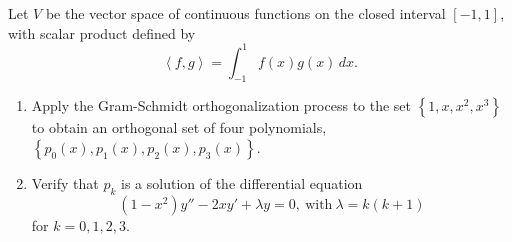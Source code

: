 \documentclass{article}
\begin{document}
\begin{problem}
 Let $V$ be the vector space of continuous functions on the closed interval $[-1,1]$, with scalar product defined by
 \[
\left<f,g \right> = \int_{-1}^{1} f(x)g(x)\,dx 
.\] 

\begin{enumerate}[label=(\alph*)]
  \item Apply the Gram-Schmidt orthogonalization process to the set $\left\{ 1,x,x^{2},x^{3} \right\} $ to obtain an orthogonal set of four polynomials, $\left\{ p_0(x),p_1(x),p_2(x),p_3(x) \right\} $. 
    \item Verify that $p_k$ is a solution of the differential equation 
      \[
        (1-x^{2})y''-2xy'+\lambda y = 0,\ \text{with}\ \lambda=k(k+1)
      \] for $k=0,1,2,3$.  
\end{enumerate}
\end{problem}
\end{document}
